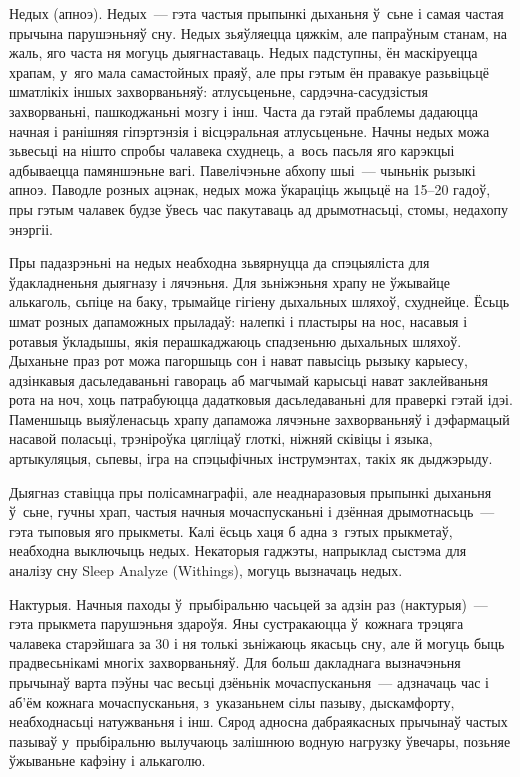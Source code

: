 Недых (апноэ). Недых~--- гэта частыя прыпынкі дыханьня ў~сьне і самая частая прычына парушэньняў сну. Недых зьяўляецца цяжкім, але папраўным станам, на жаль, яго часта ня могуць дыягнаставаць. Недых падступны, ён маскіруецца храпам, у~яго мала самастойных праяў, але пры гэтым ён правакуе разьвіцьцё шматлікіх іншых захворваньняў: атлусьценьне, сардэчна-сасудзістыя захворваньні, пашкоджаньні мозгу і інш. Часта да гэтай праблемы дадаюцца начная і ранішняя гіпэртэнзія і вісцэральная атлусьценьне. Начны недых можа зьвесьці на нішто спробы чалавека схуднець, а~вось пасьля яго карэкцыі адбываецца памяншэньне вагі. Павелічэньне абхопу шыі~--- чыньнік рызыкі апноэ. Паводле розных ацэнак, недых можа ўкараціць жыцьцё на 15--20 гадоў, пры гэтым чалавек будзе ўвесь час пакутаваць ад дрымотнасьці, стомы, недахопу энэргіі.

Пры падазрэньні на недых неабходна зьвярнуцца да спэцыяліста для ўдакладненьня дыягназу і лячэньня. Для зьніжэньня храпу не ўжывайце алькаголь, сьпіце на баку, трымайце гігіену дыхальных шляхоў, схуднейце. Ёсьць шмат розных дапаможных прыладаў: налепкі і пластыры на нос, насавыя і ротавыя ўкладышы, якія перашкаджаюць спадзеньню дыхальных шляхоў. Дыханьне праз рот можа пагоршыць сон і нават павысіць рызыку карыесу, адзінкавыя дасьледаваньні гавораць аб магчымай карысьці нават заклейваньня рота на ноч, хоць патрабуюцца дадатковыя дасьледаваньні для праверкі гэтай ідэі. Паменшыць выяўленасьць храпу дапаможа лячэньне захворваньняў і дэфармацый насавой поласьці, трэніроўка цягліцаў глоткі, ніжняй сківіцы і языка, артыкуляцыя, сьпевы, ігра на спэцыфічных інструмэнтах, такіх як дыджэрыду.

Дыягназ ставіцца пры полісамнаграфіі, але неаднаразовыя прыпынкі дыханьня ў~сьне, гучны храп, частыя начныя мочаспусканьні і дзённая дрымотнасьць~--- гэта тыповыя яго прыкметы. Калі ёсьць хаця б адна з~гэтых прыкметаў, неабходна выключыць недых. Некаторыя гаджэты, напрыклад сыстэма для аналізу сну Sleep Analyze (Withings), могуць вызначаць недых.

Нактурыя. Начныя паходы ў~прыбіральню часьцей за адзін раз (нактурыя)~--- гэта прыкмета парушэньня здароўя. Яны сустракаюцца ў~кожнага трэцяга чалавека старэйшага за 30 і ня толькі зьніжаюць якасьць сну, але й могуць быць прадвесьнікамі многіх захворваньняў. Для больш дакладнага вызначэньня прычынаў варта пэўны час весьці дзёньнік мочаспусканьня~--- адзначаць час і аб'ём кожнага мочаспусканьня, з~указаньнем сілы пазыву, дыскамфорту, неабходнасьці натужваньня і інш. Сярод адносна дабраякасных прычынаў частых пазываў у~прыбіральню вылучаюць залішнюю водную нагрузку ўвечары, позьняе ўжываньне кафэіну і алькаголю.


